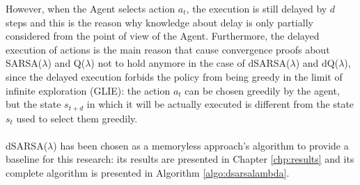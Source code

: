                 However, when the Agent selects action $a_t$, the execution is still delayed by $d$ steps and this is the reason why knowledge about delay is only partially considered from the point of view of the Agent. Furthermore, the delayed execution of actions is the main reason that cause convergence proofs about SARSA($\lambda$) and Q($\lambda$) not to hold anymore in the case of dSARSA($\lambda$) and dQ($\lambda$), since the delayed execution forbids the policy from being greedy in the limit of infinite exploration (GLIE): the action $a_t$ can be chosen greedily by the agent, but the state $s_{t+d}$ in which it will be actually executed is different from the state $s_t$ used to select them greedily. 
                \\\\
                dSARSA($\lambda$) has been chosen as a memoryless approach's algorithm to provide a baseline for this research: its results are presented in Chapter \ref{chp:results} and its complete algorithm is presented in Algorithm \ref{algo:dsarsalambda}.
                
